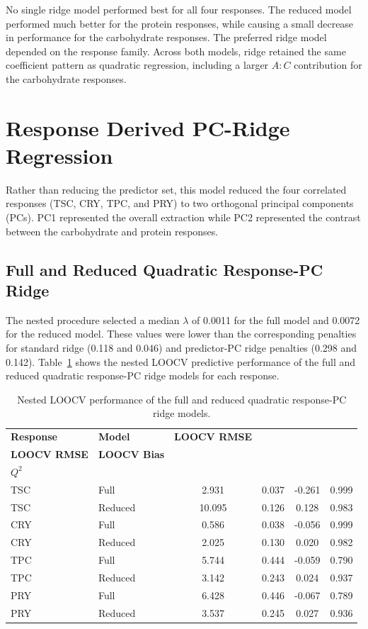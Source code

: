 \documentclass[MScDSA]{uccthesis}
\begin{document}
No single ridge model performed best for all four responses. The reduced model performed much better for the protein responses, while causing a small decrease in performance for the carbohydrate responses. The preferred ridge model depended on the response family. Across both models, ridge retained the same coefficient pattern as quadratic regression, including a larger $A:C$ contribution for the carbohydrate responses.


\section{Response Derived PC-Ridge Regression}
\label{sec:response_pc_ridge_reg}
Rather than reducing the predictor set, this model reduced the four correlated responses (TSC, CRY, TPC, and PRY) to two orthogonal principal components (PCs). PC1 represented the overall extraction while PC2 represented the contrast between the carbohydrate and protein responses.

\subsection{Full and Reduced Quadratic Response-PC Ridge}
\label{sec:response_pc_ridge}
The nested procedure selected a median $\lambda$ of 0.0011 for the full model and 0.0072 for the reduced model. These values were lower than the corresponding penalties for standard ridge (0.118 and 0.046) and predictor-PC ridge penalties (0.298 and 0.142).
Table~\ref{tab:response_pc_ridge_loocv} shows the nested LOOCV predictive performance of the full and reduced quadratic response-PC ridge models for each response.

\begin{table}[H]
\centering
\fontsize{10}{12}\selectfont
\setlength{\tabcolsep}{4pt}
\caption{Nested LOOCV performance of the full and reduced quadratic response-PC ridge models.}
\label{tab:response_pc_ridge_loocv}
\begin{tabular}{llcccc}
\toprule
\textbf{Response} & \textbf{Model} & \textbf{LOOCV RMSE}& \makecell{\textbf{Scaled}\\\textbf{LOOCV RMSE}} & \textbf{LOOCV Bias} & \makecell{\textbf{Predictive}\\\textbf{$Q^2$}} \\
\midrule
TSC & Full & 2.931 & 0.037 & -0.261 & 0.999 \\
TSC & Reduced & 10.095 & 0.126 & 0.128 & 0.983 \\
CRY & Full & 0.586 & 0.038 & -0.056 & 0.999 \\
CRY & Reduced & 2.025 & 0.130 & 0.020 & 0.982 \\
TPC & Full & 5.744 & 0.444 & -0.059 & 0.790 \\
TPC & Reduced & 3.142 & 0.243 & 0.024 & 0.937 \\
PRY & Full & 6.428 & 0.446 & -0.067 & 0.789 \\
PRY & Reduced & 3.537 & 0.245 & 0.027 & 0.936 \\
\bottomrule
\end{tabular}
\end{table}
\end{document}
